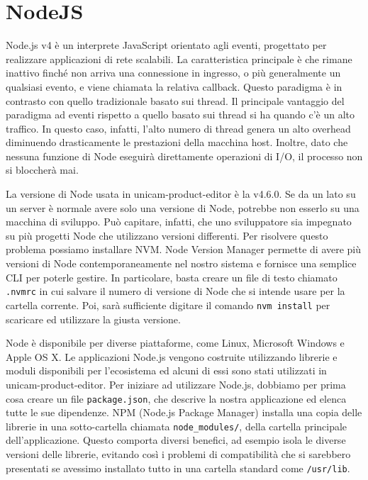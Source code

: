 \section{NodeJS}
Node.js\cite{node} v4 è un interprete JavaScript orientato agli eventi, progettato per realizzare applicazioni di rete scalabili.
La caratteristica principale è che rimane inattivo finché non arriva una connessione in ingresso, o più generalmente un qualsiasi evento, e viene chiamata la relativa callback.
Questo paradigma è in contrasto con quello tradizionale basato sui thread.
Il principale vantaggio del paradigma ad eventi rispetto a quello basato sui thread si ha quando c'è un alto traffico.
In questo caso, infatti, l'alto numero di thread genera un alto overhead diminuendo drasticamente le prestazioni della macchina host.
Inoltre, dato che nessuna funzione di Node eseguirà direttamente operazioni di I/O, il processo non si bloccherà mai.

La versione di Node usata in unicam-product-editor è la v4.6.0.
Se da un lato su un server è normale avere solo una versione di Node, potrebbe non esserlo su una macchina di sviluppo.
Può capitare, infatti, che uno sviluppatore sia impegnato su più progetti Node che utilizzano versioni differenti.
Per risolvere questo problema possiamo installare NVM.
Node Version Manager permette di avere più versioni di Node contemporaneamente nel nostro sistema e fornisce una semplice CLI per poterle gestire.
In particolare, basta creare un file di testo chiamato \texttt{.nvmrc} in cui salvare il numero di versione di Node che si intende usare per la cartella corrente.
Poi, sarà sufficiente digitare il comando \texttt{nvm install} per scaricare ed utilizzare la giusta versione.

Node è disponibile per diverse piattaforme, come Linux, Microsoft Windows e Apple OS X.
Le applicazioni Node.js vengono costruite utilizzando librerie e moduli disponibili per l'ecosistema ed alcuni di essi sono stati utilizzati in unicam-product-editor.
Per iniziare ad utilizzare Node.js, dobbiamo per prima cosa creare un file \texttt{package.json}, che descrive la nostra applicazione ed elenca tutte le sue dipendenze.
NPM (Node.js Package Manager) installa una copia delle librerie in una sotto-cartella chiamata \texttt{node\_modules/}, della cartella principale dell'applicazione. 
Questo comporta diversi benefici, ad esempio isola le diverse versioni delle librerie, evitando così i problemi di compatibilità che si sarebbero presentati se avessimo installato tutto in una cartella standard come \texttt{/usr/lib}.

